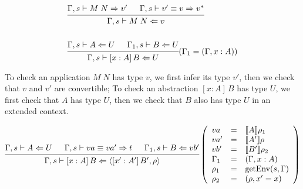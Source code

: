 \documentclass{article}
\theoremstyle{remark}
\begin{document}
\begin{align}
  &\begin{prooftree}
    \hypo{\Gamma,s \vdash M \; N \Rightarrow v'}
    \hypo{\Gamma,s \vdash v' \equiv v \Rightarrow v^*}
    \infer2{\Gamma,s \vdash M \; N \Leftarrow v}
  \end{prooftree} \\
  \nonumber \\
  &\begin{prooftree}
    \hypo{\Gamma,s \vdash A \Leftarrow U}
    \hypo{\Gamma_1,s \vdash B \Leftarrow U}
    \infer2{\Gamma,s \vdash [x : A] \, B \Leftarrow U}
  \end{prooftree}(\Gamma_1 = (\Gamma, x : A)) \label{rule:abs}
\end{align}

To check an application $M \; N$ has type $v$, we first infer its type $v'$, then we check that $v$ and $v'$ are convertible; To check an abstraction $[x : A] \, B$ has type $U$, we first check that $A$ has type $U$, then we check that $B$ also has type $U$ in an extended context.

\begin{align}
  \begin{prooftree}
    \hypo{\Gamma,s \vdash A \Leftarrow U}
    \hypo{\Gamma,s \vdash va \equiv va' \Rightarrow t}
    \hypo{\Gamma_1,s \vdash B \Leftarrow vb'}
    \infer3{\Gamma,s \vdash [x : A] \, B \Leftarrow \langle [x' : A'] \, B', \rho \rangle}
  \end{prooftree}\left(\begin{array}{l l l}
                         va &= &\llbracket A \rrbracket \rho_1 \\
                         va' &= &\llbracket A' \rrbracket \rho \\
                         vb' &= &\llbracket B' \rrbracket \rho_2 \\
                         \Gamma_1 &= & (\Gamma, x : A) \\
                         \rho_1 &= &\text{getEnv}(s, \Gamma) \\
                         \rho_2 &= &(\rho, x' = x)
                       \end{array}\right)
\end{align}
\end{document}
